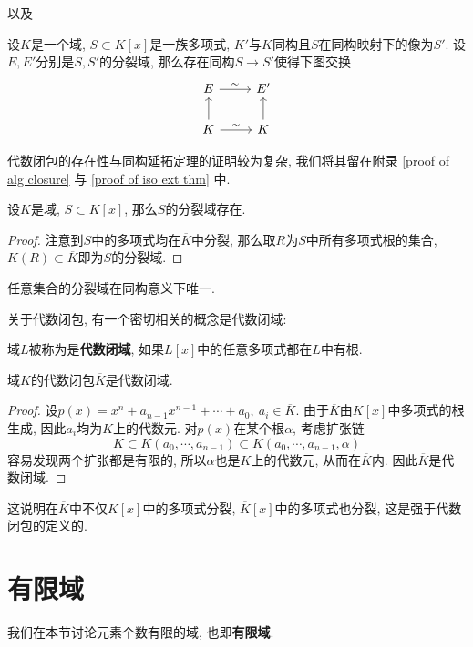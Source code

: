 以及
\begin{thm}[同构延拓定理]\label{iso ext thm}
    设$K$是一个域, $S\subset K[x]$是一族多项式, $K'$与$K$同构且$S$在同构映射下的像为$S'$.
    设$E,E'$分别是$S,S'$的分裂域, 那么存在同构$S\to S'$使得下图交换
    \[\begin{tikzcd}
        E\ar[r, "\sim"] & E'\\
        K\ar[u] \ar[r, "\sim"] & K\ar[u]
    \end{tikzcd}\]
\end{thm}

代数闭包的存在性与同构延拓定理的证明较为复杂, 我们将其留在附录 \ref{proof of alg closure} 与 \ref{proof of iso ext thm} 中.

\begin{col}
    设$K$是域, $S\subset K[x]$, 那么$S$的分裂域存在.
\end{col}
\begin{proof}
    注意到$S$中的多项式均在$\overline{K}$中分裂, 那么取$R$为$S$中所有多项式根的集合, $K(R)\subset\overline{K}$即为$S$的分裂域.
\end{proof}

\begin{col}
    任意集合的分裂域在同构意义下唯一.
\end{col}

关于代数闭包, 有一个密切相关的概念是代数闭域:
\begin{defn}
    域$L$被称为是\textbf{代数闭域}, 如果$L[x]$中的任意多项式都在$L$中有根.
\end{defn}
\begin{prop}
    域$K$的代数闭包$\overline{K}$是代数闭域.
\end{prop}
\begin{proof}
    设$p(x)=x^n+a_{n-1}x^{n-1}+\cdots+a_0,\ a_i\in\overline{K}$.
    由于$\overline{K}$由$K[x]$中多项式的根生成, 因此$a_i$均为$K$上的代数元.
    对$p(x)$在某个根$\alpha$, 考虑扩张链
    \[K\subset K(a_0,\cdots,a_{n-1})\subset K(a_0,\cdots,a_{n-1},\alpha)\]
    容易发现两个扩张都是有限的, 所以$\alpha$也是$K$上的代数元, 从而在$\overline{K}$内.
    因此$\overline{K}$是代数闭域.
\end{proof}
这说明在$\overline{K}$中不仅$K[x]$中的多项式分裂, $\overline{K}[x]$中的多项式也分裂, 这是强于代数闭包的定义的.

\section{有限域}

我们在本节讨论元素个数有限的域, 也即\textbf{有限域}.

